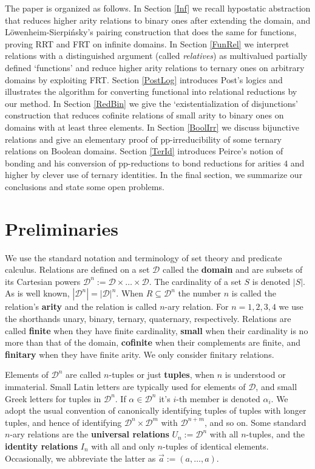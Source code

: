 \documentclass[11pt]{article}
\theoremstyle{plain}
\theoremstyle{definition}
\def\D{\mathcal{D}}
\def\a{\alpha}
\begin{document}
The paper is organized as follows. In Section \ref{Inf} we recall hypostatic abstraction that reduces higher arity relations to binary ones after extending the domain, and L\"owenheim-Sierpi\'nsky's pairing construction that does the same for functions, proving RRT and FRT on infinite domains. In Section \ref{FunRel} we interpret relations with a distinguished argument (called {\it relatives}) as multivalued partially defined `functions' and reduce higher arity relations to ternary ones on arbitrary domains by exploiting FRT. Section \ref{PostLog} introduces Post's logics and illustrates the algorithm for converting functional into relational reductions by our method. In Section \ref{RedBin} we give the `existentialization of disjunctions' construction that reduces cofinite relations of small arity to binary ones on domains with at least three elements. In Section \ref{BoolIrr} we discuss bijunctive relations and give an elementary proof of pp-irreducibility of some ternary relations on Boolean domains. Section \ref{TerId} introduces Peirce's notion of bonding and his conversion of pp-reductions to bond reductions for arities $4$ and higher by clever use of ternary identities. In the final section, we summarize our conclusions and state some open problems.




\section{Preliminaries}\label{Prelim}

We use the standard notation and terminology of set theory and predicate calculus. Relations are defined on a set $\D$ called the {\bf domain} and are subsets of its Cartesian powers $\D^n:=\D\times\dots\times\D$. The cardinality of a set $S$ is denoted $|S|$. As is well known, $|\D^n|=|\D|^n$. When $R\subseteq\D^n$ the number $n$ is called the relation's {\bf arity} and the relation is called $n$-ary relation. For $n=1,2,3,4$ we use the shorthands unary, binary, ternary, quaternary, respectively. Relations are called {\bf finite} when they have finite cardinality, {\bf small} when their cardinality is no more than that of the domain, {\bf cofinite} when their complements are finite, and {\bf finitary} when they have finite arity. We only consider finitary relations.

Elements of $\D^n$ are called $n$-tuples or just {\bf tuples}, when $n$ is understood or immaterial. Small Latin letters are typically used for elements of $\D$, and small Greek letters for tuples in $\D^n$. If $\a\in\D^n$ it's $i$-th member is denoted $\a_i$. We adopt the usual convention of canonically identifying tuples of tuples with longer tuples, and hence of identifying $\D^n\times\D^{m}$ with $\D^{n+m}$, and so on. Some standard $n$-ary relations are the {\bf universal relations} $U_n:=\D^n$ with all $n$-tuples, and the {\bf identity relations} $I_n$ with all and only $n$-tuples of identical elements. Occasionally, we abbreviate the latter as $\vec{a}:=(a,\dots,a)$. 
\end{document}
